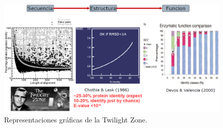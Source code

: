 \begin{figure}
\centering
\includegraphics[width = \textwidth]{figs/twilight-zone.png}
\caption{Representaciones gráficas de la Twilight Zone.}
\end{figure}